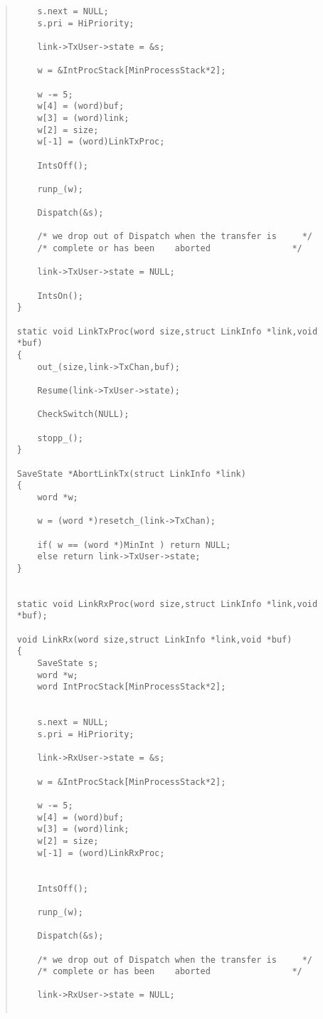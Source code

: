 \begin {quote}
\begin{verbatim}
    s.next = NULL;
    s.pri = HiPriority;
    
    link->TxUser->state = &s;
    
    w = &IntProcStack[MinProcessStack*2];

    w -= 5;
    w[4] = (word)buf;
    w[3] = (word)link;
    w[2] = size;
    w[-1] = (word)LinkTxProc;
    
    IntsOff();

    runp_(w);
        
    Dispatch(&s);

    /* we drop out of Dispatch when the transfer is     */
    /* complete or has been    aborted                */

    link->TxUser->state = NULL;

    IntsOn();
}

static void LinkTxProc(word size,struct LinkInfo *link,void *buf)
{
    out_(size,link->TxChan,buf);
    
    Resume(link->TxUser->state);
    
    CheckSwitch(NULL);
    
    stopp_();
}

SaveState *AbortLinkTx(struct LinkInfo *link)
{
    word *w;
    
    w = (word *)resetch_(link->TxChan);

    if( w == (word *)MinInt ) return NULL;
    else return link->TxUser->state;
}


static void LinkRxProc(word size,struct LinkInfo *link,void *buf);

void LinkRx(word size,struct LinkInfo *link,void *buf)
{
    SaveState s;
    word *w;
    word IntProcStack[MinProcessStack*2];
    
    
    s.next = NULL;
    s.pri = HiPriority;
    
    link->RxUser->state = &s;
    
    w = &IntProcStack[MinProcessStack*2];

    w -= 5;
    w[4] = (word)buf;
    w[3] = (word)link;
    w[2] = size;
    w[-1] = (word)LinkRxProc;
    

    IntsOff();

    runp_(w);
        
    Dispatch(&s);

    /* we drop out of Dispatch when the transfer is     */
    /* complete or has been    aborted                */
    
    link->RxUser->state = NULL;


\end{verbatim}
\end{quote}

